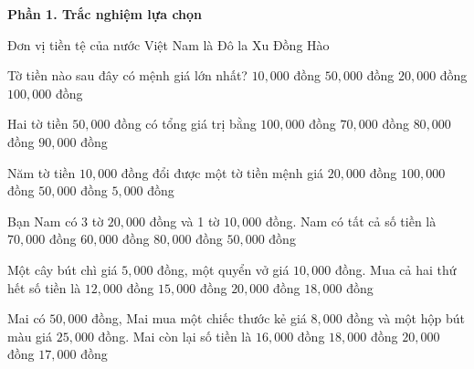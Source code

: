 \textbf{Phần 1. Trắc nghiệm lựa chọn}

\begin{ex} %
Đơn vị tiền tệ của nước Việt Nam là
\choice
{Đô la}
{Xu}
{\True Đồng}
{Hào}
\end{ex}

\begin{ex} %
Tờ tiền nào sau đây có mệnh giá lớn nhất?
\choice
{$10,000$ đồng}
{$50,000$ đồng}
{$20,000$ đồng}
{\True $100,000$ đồng}
\end{ex}

\begin{ex} %
Hai tờ tiền $50,000$ đồng có tổng giá trị bằng
\choice
{\True $100,000$ đồng}
{$70,000$ đồng}
{$80,000$ đồng}
{$90,000$ đồng}
\end{ex}

\begin{ex} %
Năm tờ tiền $10,000$ đồng đổi được một tờ tiền mệnh giá
\choice
{$20,000$ đồng}
{$100,000$ đồng}
{\True $50,000$ đồng}
{$5,000$ đồng}
\end{ex}

\begin{ex} %
Bạn Nam có 3 tờ $20,000$ đồng và 1 tờ $10,000$ đồng. Nam có tất cả số tiền là
\choice
{\True $70,000$ đồng}
{$60,000$ đồng}
{$80,000$ đồng}
{$50,000$ đồng}
\end{ex}

\begin{ex} %
Một cây bút chì giá $5,000$ đồng, một quyển vở giá $10,000$ đồng. Mua cả hai thứ hết số tiền là
\choice
{$12,000$ đồng}
{\True $15,000$ đồng}
{$20,000$ đồng}
{$18,000$ đồng}
\end{ex}

\begin{ex} %
Mai có $50,000$ đồng, Mai mua một chiếc thước kẻ giá $8,000$ đồng và một hộp bút màu giá $25,000$ đồng. Mai còn lại số tiền là
\choice
{$16,000$ đồng}
{$18,000$ đồng}
{$20,000$ đồng}
{\True $17,000$ đồng}
\end{ex}

